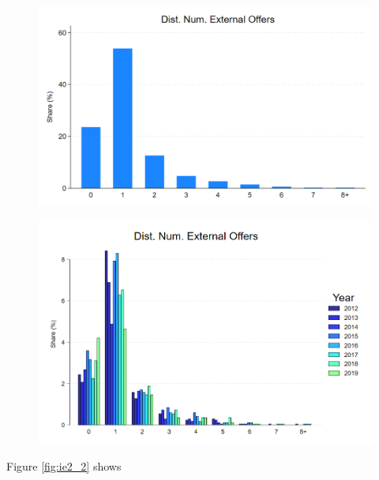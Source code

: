 \documentclass[12pt]{article}
\begin{document}
\begin{figure}[H]
\caption{}
\label{fig:ie2_0}
\centering{}%
\includegraphics[scale=0.27]{figures/IE2_dist_external_offers.png}
\end{figure}


\begin{figure}[H]
\caption{}
\label{fig:ie2_1}
\centering{}%
\includegraphics[scale=0.27]{figures/IE2_dist_external_offers_byyear.png}
\end{figure}






Figure \ref{fig:ie2_2} shows 
\end{document}
